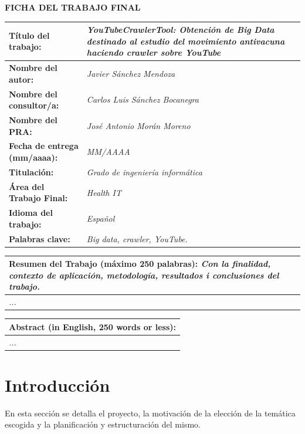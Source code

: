 \documentclass[11pt,a4paper]{article}
\begin{document}
\begin{center}
\textbf{FICHA DEL TRABAJO FINAL}
\end{center}
\begin{tabularx}{\textwidth}{|X|X|}
\hline 
\textbf{Título del trabajo:} &\cellcolor{gray!25} \textit{YouTubeCrawlerTool: Obtención de Big Data destinado al estudio del movimiento antivacuna haciendo crawler sobre YouTube} \\ 
\hline 
\textbf{Nombre del autor:} &\cellcolor{gray!25} \textit{Javier Sánchez Mendoza} \\ 
\hline 
\textbf{Nombre del consultor/a:} &\cellcolor{gray!25} \textit{Carlos Luis Sánchez Bocanegra} \\ 
\hline 
\textbf{Nombre del PRA:} &\cellcolor{gray!25} \textit{José Antonio Morán Moreno} \\ 
\hline 
\textbf{Fecha de entrega (mm/aaaa):} &\cellcolor{gray!25} \textit{MM/AAAA} \\ 
\hline 
\textbf{Titulación:} &\cellcolor{gray!25} \textit{Grado de ingeniería informática} \\ 
\hline 
\textbf{Área del Trabajo Final:} &\cellcolor{gray!25} \textit{Health IT} \\ 
\hline 
\textbf{Idioma del trabajo:} &\cellcolor{gray!25} \textit{Español} \\ 
\hline 
\textbf{Palabras clave:} &\cellcolor{gray!25} \textit{Big data, crawler, YouTube.} \\ 
\hline
\end{tabularx} 
\begin{tabularx}{\textwidth}{|X|}
\textbf{Resumen del Trabajo (máximo 250 palabras):} \textit{Con la finalidad, contexto de aplicación, metodología, resultados i conclusiones del trabajo.} \\ 
\hline 
\cellcolor{gray!25} \textit{...} \\
\hline 
\end{tabularx} 
\newpage 


\begin{tabularx}{\textwidth}{|X|}
\hline 
\textbf{Abstract (in English, 250 words or less):} \\ 
\hline 
\cellcolor{gray!25} \textit{...} \\
\hline 
\end{tabularx} 
\newpage 


\tableofcontents
\newpage


\listoffigures
\newpage


\section{Introducción}
En esta sección se detalla el proyecto, la motivación de la elección de la temática escogida y la planificación y estructuración del mismo.
\end{document}
